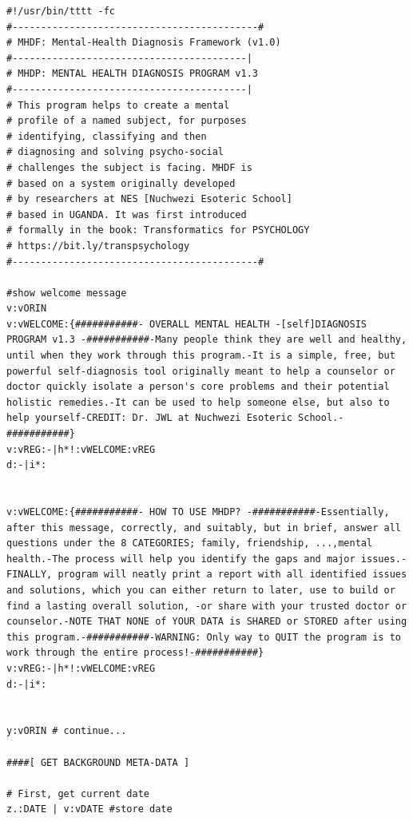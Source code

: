 \documentclass[a4paper, 18pt]{book} %
\begin{document}
{
 \small
  \begin{tcolorbox}[teaterminalstyle, title=TEA EXAMPLE: MENTAL HEALTH DIAGNOSIS PROGRAM v1.0.0.1, breakable]
  \begin{lstlisting}[language=TEA,breaklines=true]
#!/usr/bin/tttt -fc
#-------------------------------------------#
# MHDF: Mental-Health Diagnosis Framework (v1.0)
#-----------------------------------------|
# MHDP: MENTAL HEALTH DIAGNOSIS PROGRAM v1.3
#-----------------------------------------|
# This program helps to create a mental
# profile of a named subject, for purposes
# identifying, classifying and then
# diagnosing and solving psycho-social 
# challenges the subject is facing. MHDF is
# based on a system originally developed 
# by researchers at NES [Nuchwezi Esoteric School]
# based in UGANDA. It was first introduced
# formally in the book: Transformatics for PSYCHOLOGY 
# https://bit.ly/transpsychology
#-------------------------------------------#

#show welcome message
v:vORIN
v:vWELCOME:{###########- OVERALL MENTAL HEALTH -[self]DIAGNOSIS PROGRAM v1.3 -###########-Many people think they are well and healthy, until when they work through this program.-It is a simple, free, but powerful self-diagnosis tool originally meant to help a counselor or doctor quickly isolate a person's core problems and their potential holistic remedies.-It can be used to help someone else, but also to help yourself-CREDIT: Dr. JWL at Nuchwezi Esoteric School.-###########}
v:vREG:-|h*!:vWELCOME:vREG
d:-|i*:


v:vWELCOME:{###########- HOW TO USE MHDP? -###########-Essentially, after this message, correctly, and suitably, but in brief, answer all questions under the 8 CATEGORIES; family, friendship, ...,mental health.-The process will help you identify the gaps and major issues.- FINALLY, program will neatly print a report with all identified issues and solutions, which you can either return to later, use to build or find a lasting overall solution, -or share with your trusted doctor or counselor.-NOTE THAT NONE of YOUR DATA is SHARED or STORED after using this program.-###########-WARNING: Only way to QUIT the program is to work through the entire process!-###########}
v:vREG:-|h*!:vWELCOME:vREG
d:-|i*:


y:vORIN # continue...

####[ GET BACKGROUND META-DATA ]

# First, get current date
z.:DATE | v:vDATE #store date


\end{lstlisting}
\end{tcolorbox}}
\end{document}
